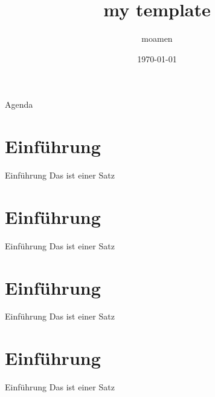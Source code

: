 \documentclass{beamer}
\author{moamen}
\title{my template}
\date{\today}
\begin{document}
	\begin{frame}[plain]
		\titlepage
	\end{frame}		
	

	\begin{frame}{Agenda}
		\tableofcontents
	\end{frame}
	
	\section{Einführung}
	\begin{frame}{Einführung}
		Das ist einer Satz
	\end{frame}
	
	\section{Einführung}
	\begin{frame}{Einführung}
		Das ist einer Satz
	\end{frame}
	
	\section{Einführung}
	\begin{frame}{Einführung}
		Das ist einer Satz
	\end{frame}
	
	\section{Einführung}
	\begin{frame}{Einführung}
		Das ist einer Satz
	\end{frame}
	
\end{document}

